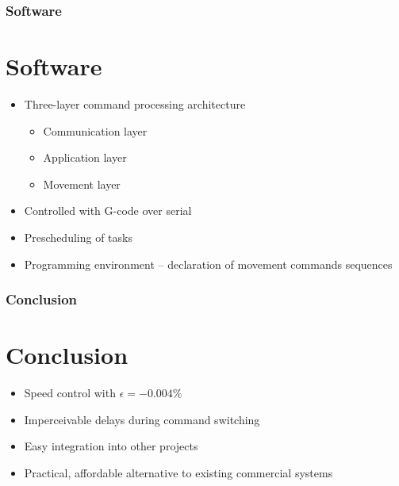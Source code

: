 \documentclass[aspectratio=43]{beamer}
\begin{document}
\begin{frame}[fragile]
  \frametitle{Software}
  \section{Software}
  \begin{itemize}
    \item Three-layer command processing architecture
      \begin{itemize}
        \item Communication layer
        \item Application layer
        \item Movement layer
      \end{itemize}
    \item Controlled with G-code over serial
    \item Prescheduling of tasks
    \item Programming environment -- declaration of movement commands sequences
  \end{itemize}
\end{frame}

\begin{frame}[fragile]
  \frametitle{Conclusion}
  \section{Conclusion}
  \begin{itemize}
    \item Speed control with $\epsilon=-0.004\%$
    \item Imperceivable delays during command switching
    \item Easy integration into other projects
    \item Practical, affordable alternative to existing commercial systems
  \end{itemize}
\end{frame}
\end{document}
